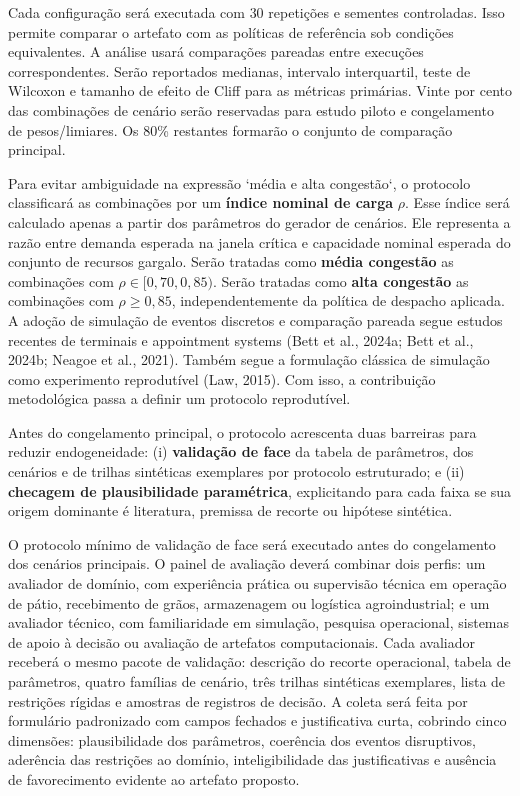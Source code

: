 \documentclass[
  12pt,
  oneside,
  a4paper,
  sumario=tradicional,
  brazil
]{abntex2}
\begin{document}
Cada configura\c{c}\~ao ser\'a executada com 30 repeti\c{c}\~oes e sementes controladas. Isso permite comparar o artefato com as pol\'iticas de refer\^encia sob condi\c{c}\~oes equivalentes. A an\'alise usar\'a compara\c{c}\~oes pareadas entre execu\c{c}\~oes correspondentes. Ser\~ao reportados medianas, intervalo interquartil, teste de Wilcoxon e tamanho de efeito de Cliff para as m\'etricas prim\'arias. Vinte por cento das combina\c{c}\~oes de cen\'ario ser\~ao reservadas para estudo piloto e congelamento de pesos/limiares. Os 80\% restantes formar\~ao o conjunto de compara\c{c}\~ao principal.

Para evitar ambiguidade na express\~ao `m\'edia e alta congest\~ao`, o protocolo classificar\'a as combina\c{c}\~oes por um \textbf{\'indice nominal de carga} $\rho$. Esse \'indice ser\'a calculado apenas a partir dos par\^ametros do gerador de cen\'arios. Ele representa a raz\~ao entre demanda esperada na janela cr\'itica e capacidade nominal esperada do conjunto de recursos gargalo. Ser\~ao tratadas como \textbf{m\'edia congest\~ao} as combina\c{c}\~oes com $\rho \in [0{,}70,0{,}85)$. Ser\~ao tratadas como \textbf{alta congest\~ao} as combina\c{c}\~oes com $\rho \geq 0{,}85$, independentemente da pol\'itica de despacho aplicada. A ado\c{c}\~ao de simula\c{c}\~ao de eventos discretos e compara\c{c}\~ao pareada segue estudos recentes de terminais e appointment systems (Bett et al., 2024a; Bett et al., 2024b; Neagoe et al., 2021). Tamb\'em segue a formula\c{c}\~ao cl\'assica de simula\c{c}\~ao como experimento reprodut\'ivel (Law, 2015). Com isso, a contribui\c{c}\~ao metodol\'ogica passa a definir um protocolo reprodut\'ivel.

Antes do congelamento principal, o protocolo acrescenta duas barreiras para reduzir endogeneidade: (i) \textbf{valida\c{c}\~ao de face} da tabela de par\^ametros, dos cen\'arios e de trilhas sint\'eticas exemplares por protocolo estruturado; e (ii) \textbf{checagem de plausibilidade param\'etrica}, explicitando para cada faixa se sua origem dominante \'e literatura, premissa de recorte ou hip\'otese sint\'etica.

O protocolo m\'inimo de valida\c{c}\~ao de face ser\'a executado antes do congelamento dos cen\'arios principais. O painel de avalia\c{c}\~ao dever\'a combinar dois perfis: um avaliador de dom\'inio, com experi\^encia pr\'atica ou supervis\~ao t\'ecnica em opera\c{c}\~ao de p\'atio, recebimento de gr\~aos, armazenagem ou log\'istica agroindustrial; e um avaliador t\'ecnico, com familiaridade em simula\c{c}\~ao, pesquisa operacional, sistemas de apoio \`a decis\~ao ou avalia\c{c}\~ao de artefatos computacionais. Cada avaliador receber\'a o mesmo pacote de valida\c{c}\~ao: descri\c{c}\~ao do recorte operacional, tabela de par\^ametros, quatro fam\'ilias de cen\'ario, tr\^es trilhas sint\'eticas exemplares, lista de restri\c{c}\~oes r\'igidas e amostras de registros de decis\~ao. A coleta ser\'a feita por formul\'ario padronizado com campos fechados e justificativa curta, cobrindo cinco dimens\~oes: plausibilidade dos par\^ametros, coer\^encia dos eventos disruptivos, ader\^encia das restri\c{c}\~oes ao dom\'inio, inteligibilidade das justificativas e aus\^encia de favorecimento evidente ao artefato proposto.
\end{document}
